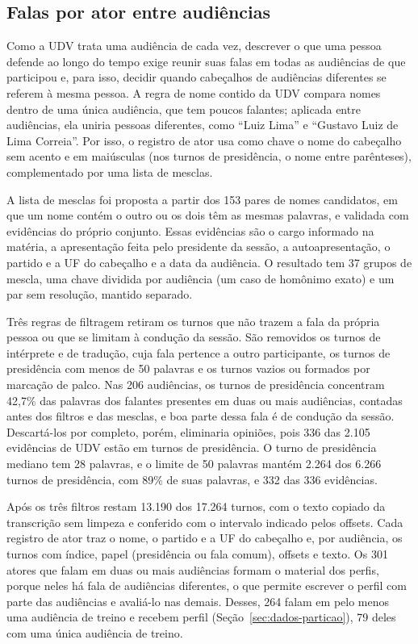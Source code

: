 \subsection{Falas por ator entre audiências}
\label{sec:metodo-atores}

Como a UDV trata uma audiência de cada vez, descrever o que uma pessoa defende ao longo do tempo
exige reunir suas falas em todas as audiências de que participou e, para isso, decidir quando
cabeçalhos de audiências diferentes se referem à mesma pessoa. A regra de nome contido da UDV compara
nomes dentro de uma única audiência, que tem poucos falantes; aplicada entre audiências, ela uniria
pessoas diferentes, como ``Luiz Lima'' e ``Gustavo Luiz de Lima Correia''. Por isso, o registro de ator usa como chave o
nome do cabeçalho sem acento e em maiúsculas (nos turnos de presidência, o nome entre parênteses),
complementado por uma lista de mesclas.

A lista de mesclas foi proposta a partir dos 153 pares de nomes candidatos, em que um nome contém o
outro ou os dois têm as mesmas palavras, e validada com evidências do próprio conjunto. Essas
evidências são o cargo informado na matéria, a apresentação feita pelo presidente da sessão, a
autoapresentação, o partido e a UF do cabeçalho e a data da audiência. O resultado tem 37 grupos de mescla, uma chave
dividida por audiência (um caso de homônimo exato) e um par sem resolução, mantido separado. 

Três regras de filtragem retiram os turnos que não trazem a fala da própria pessoa ou que se limitam
à condução da sessão. São removidos os turnos de intérprete e de tradução, cuja fala pertence a outro
participante, os turnos de presidência com menos de 50 palavras e os turnos vazios ou formados por
marcação de palco. Nas 206 audiências, os turnos de presidência concentram 42,7\% das palavras dos
falantes presentes em duas ou mais audiências, contadas antes dos filtros e das mesclas, e boa parte
dessa fala é de condução da sessão. Descartá-los por completo,
porém, eliminaria opiniões, pois 336 das 2.105 evidências de UDV estão em turnos de presidência. O
turno de presidência mediano tem 28 palavras, e o limite de 50 palavras mantém 2.264 dos 6.266 turnos
de presidência, com 89\% de suas palavras, e 332 das 336 evidências.

Após os três filtros restam 13.190 dos 17.264 turnos, com o texto copiado da transcrição sem limpeza
e conferido com o intervalo indicado pelos offsets. Cada registro de ator traz o nome, o partido e
a UF do cabeçalho e, por audiência, os turnos com índice, papel (presidência ou fala comum), offsets e
texto. Os 301 atores que falam em duas ou mais audiências formam o material dos perfis, porque neles
há fala de audiências diferentes, o que permite escrever o perfil com parte das audiências e avaliá-lo nas
demais. Desses, 264 falam em pelo menos uma audiência de treino e recebem perfil
(Seção~\ref{sec:dados-particao}), 79 deles com uma única audiência de treino.

